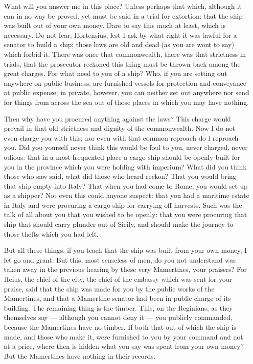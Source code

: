  What will you answer me in this place? Unless perhaps that which, although it can in no way be proved, yet must be said in a trial for extortion: that the ship was built out of your own money. Dare to say this much at least, which is necessary. Do not fear, Hortensius, lest I ask by what right it was lawful for a senator to build a ship; those laws are old and dead (as you are wont to say) which forbid it. There was once that commonwealth, there was that strictness in trials, that the prosecutor reckoned this thing must be thrown back among the great charges. For what need to you of a ship? Who, if you are setting out anywhere on public business, are furnished vessels for protection and conveyance at public expense; in private, however, you can neither set out anywhere nor send for things from across the sea out of those places in which you may have nothing.

 Then why have you procured anything against the laws? This charge would prevail in that old strictness and dignity of the commonwealth. Now I do not even charge you with this; nor even with that common reproach do I reproach you. Did you yourself never think this would be foul to you, never charged, never odious: that in a most frequented place a cargo-ship should be openly built for you in the province which you were holding with imperium? What did you think those who saw said, what did those who heard reckon? That you would bring that ship empty into Italy? That when you had come to Rome, you would set up as a shipper? Not even this could anyone suspect: that you had a maritime estate in Italy and were procuring a cargo-ship for carrying off harvests. Such was the talk of all about you that you wished to be openly: that you were procuring that ship that should carry plunder out of Sicily, and should make the journey to those thefts which you had left.

 But all these things, if you teach that the ship was built from your own money, I let go and grant. But this, most senseless of men, do you not understand was taken away in the previous hearing by these very Mamertines, your praisers? For Heius, the chief of the city, the chief of the embassy which was sent for your praise, said that the ship was made for you by the public works of the Mamertines, and that a Mamertine senator had been in public charge of its building. The remaining thing is the timber. This, on the Reginians, as they themselves say --- although you cannot deny it --- you publicly commanded, because the Mamertines have no timber. If both that out of which the ship is made, and those who make it, were furnished to you by your command and not at a price, where then is hidden what you say was spent from your own money? But the Mamertines have nothing in their records.

